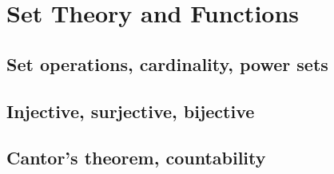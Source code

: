 
\section{Set Theory and Functions}

\subsection{Set operations, cardinality, power sets}


\subsection{Injective, surjective, bijective}


\subsection{Cantor's theorem, countability}

